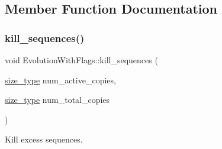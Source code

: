 \subsection{Member Function Documentation}
\mbox{\label{classretrocombinator_1_1EvolutionWithFlags_ae5a9e278233d2ea42bdef4df66d4b5b9}} 
\subsubsection{\texorpdfstring{kill\+\_\+sequences()}{kill\_sequences()}}
{\footnotesize\ttfamily void Evolution\+With\+Flags\+::kill\+\_\+sequences (\begin{DoxyParamCaption}\item[{\hyperlink{constants_8h_a8e1541b50cee66a791df4c437ccbb385}{size\+\_\+type}}]{num\+\_\+active\+\_\+copies,  }\item[{\hyperlink{constants_8h_a8e1541b50cee66a791df4c437ccbb385}{size\+\_\+type}}]{num\+\_\+total\+\_\+copies }\end{DoxyParamCaption})\hspace{0.3cm}{\ttfamily [protected]}}



Kill excess sequences. 

